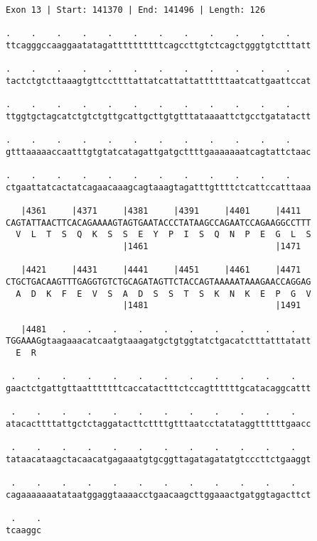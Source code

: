 \documentclass{article}
\begin{document}
\newpage
\begin{Verbatim}
Exon 13 | Start: 141370 | End: 141496 | Length: 126
 
.    .    .    .    .    .    .    .    .    .    .    .    
ttcagggccaaggaatatagattttttttttcagccttgtctcagctgggtgtctttatt
  
.    .    .    .    .    .    .    .    .    .    .    .    
tactctgtcttaaagtgttccttttattatcattattattttttaatcattgaattccat
  
.    .    .    .    .    .    .    .    .    .    .    .    
ttggtgctagcatctgtctgttgcattgcttgtgtttataaaattctgcctgatatactt
  
.    .    .    .    .    .    .    .    .    .    .    .    
gtttaaaaaccaatttgtgtatcatagattgatgcttttgaaaaaaatcagtattctaac
  
.    .    .    .    .    .    .    .    .    .    .    .    
ctgaattatcactatcagaacaaagcagtaaagtagatttgttttctcattccatttaaa
  
   |4361     |4371     |4381     |4391     |4401     |4411  
CAGTATTAACTTCACAGAAAAGTAGTGAATACCCTATAAGCCAGAATCCAGAAGGCCTTT
  V  L  T  S  Q  K  S  S  E  Y  P  I  S  Q  N  P  E  G  L  S
                       |1461                         |1471  
  
   |4421     |4431     |4441     |4451     |4461     |4471  
CTGCTGACAAGTTTGAGGTGTCTGCAGATAGTTCTACCAGTAAAAATAAAGAACCAGGAG
  A  D  K  F  E  V  S  A  D  S  S  T  S  K  N  K  E  P  G  V
                       |1481                         |1491  
  
   |4481   .    .    .    .    .    .    .    .    .    .   
TGGAAAGgtaagaaacatcaatgtaaagatgctgtggtatctgacatctttatttatatt
  E  R                                                      
  
 .    .    .    .    .    .    .    .    .    .    .    .   
gaactctgattgttaatttttttcaccatactttctccagttttttgcatacaggcattt
  
 .    .    .    .    .    .    .    .    .    .    .    .   
atacacttttattgctctaggatacttcttttgtttaatcctatataggttttttgaacc
  
 .    .    .    .    .    .    .    .    .    .    .    .   
tataacataagctacaacatgagaaatgtgcggttagatagatatgtcccttctgaaggt
  
 .    .    .    .    .    .    .    .    .    .    .    .   
cagaaaaaaatataatggaggtaaaacctgaacaagcttggaaactgatggtagacttct
  
 .    .
tcaaggc
\end{Verbatim}
\newpage
\end{document}
